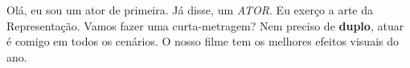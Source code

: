 

Olá, eu sou um ator de primeira. Já disse, um \emph{ATOR}. Eu exerço a arte da Representação.
Vamos fazer uma curta-metragem?
Nem preciso de \textbf{duplo}, atuar é comigo em todos os cenários.
O nosso filme tem os melhores efeitos visuais do ano.



